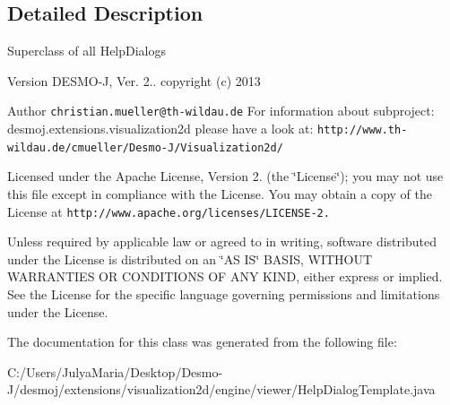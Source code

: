 \subsection{Detailed Description}
Superclass of all Help\-Dialogs

\begin{DoxyVersion}{Version}
D\-E\-S\-M\-O-\/\-J, Ver. 2.. copyright (c) 2013 
\end{DoxyVersion}
\begin{DoxyAuthor}{Author}
{\tt christian.\-mueller@th-\/wildau.\-de} For information about subproject\-: desmoj.\-extensions.\-visualization2d please have a look at\-: {\tt http\-://www.\-th-\/wildau.\-de/cmueller/\-Desmo-\/\-J/\-Visualization2d/}
\end{DoxyAuthor}
Licensed under the Apache License, Version 2. (the \char`\"{}\-License\char`\"{}); you may not use this file except in compliance with the License. You may obtain a copy of the License at {\tt http\-://www.\-apache.\-org/licenses/\-L\-I\-C\-E\-N\-S\-E-\/2.}

Unless required by applicable law or agreed to in writing, software distributed under the License is distributed on an \char`\"{}\-A\-S I\-S\char`\"{} B\-A\-S\-I\-S, W\-I\-T\-H\-O\-U\-T W\-A\-R\-R\-A\-N\-T\-I\-E\-S O\-R C\-O\-N\-D\-I\-T\-I\-O\-N\-S O\-F A\-N\-Y K\-I\-N\-D, either express or implied. See the License for the specific language governing permissions and limitations under the License. 

The documentation for this class was generated from the following file\-:\begin{DoxyCompactItemize}
\item 
C\-:/\-Users/\-Julya\-Maria/\-Desktop/\-Desmo-\/\-J/desmoj/extensions/visualization2d/engine/viewer/Help\-Dialog\-Template.\-java\end{DoxyCompactItemize}
